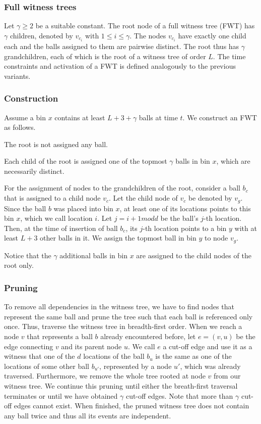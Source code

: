 \documentclass[a4paper,12pt]{article}
\begin{document}
\subsubsection{Full witness trees}
\label{sec:analysis:FullWT}
Let $\gamma \geq 2$ be a suitable constant. The root node of a full witness tree (FWT) has $\gamma$ children, denoted by $v_{c_i}$ with $1\leq i \leq \gamma$. The nodes $v_{c_i}$ have exactly one child each and the balls assigned to them are pairwise distinct. The root thus has $\gamma$ grandchildren, each of which is the root of a witness tree of order $L$. The time constraints and activation of a FWT is defined analogously to the previous variants.

\subsubsection{Construction}
\label{sec:analysis:constructionFullWT}
Assume a bin $x$ contains at least $L+3+\gamma$ balls at time $t$. We construct an FWT as follows.
\begin{compactitem}
\item The root is not assigned any ball.
\item Each child of the root is assigned one of the topmost $\gamma$ balls in bin $x$, which are necessarily distinct.
\item For the assignment of nodes to the grandchildren of the root, consider a ball $b_c$ that is assigned to a child node $v_c$. Let the child node of $v_c$ be denoted by $v_g$. Since the ball $b$ was placed into bin $x$, at least one of its locations points to this bin $x$, which we call location $i$. Let $j = i+1 mod d$ be the ball's $j$-th location. Then, at the time of insertion of ball $b_c$, its $j$-th location points to a bin $y$ with at least $L+3$ other balls in it. We assign the topmost ball in bin $y$ to node $v_g$.
\end{compactitem}
Notice that the $\gamma$ additional balls in bin $x$ are assigned to the child nodes of the root only. 

\subsubsection{Pruning}
\label{sec:analysis:pruningFullWT}
To remove all dependencies in the witness tree, we have to find nodes that represent the same ball and prune the tree such that each ball is referenced only once. Thus, traverse the witness tree in breadth-first order. When we reach a node $v$ that represents a ball $b$ already encountered before, let $e = (v,u)$ be the edge connecting $v$ and its parent node $u$. We call $e$ a cut-off edge and use it as a witness that one of the $d$ locations of the ball $b_u$ is the same as one of the locations of some other ball $b_{u'}$, represented by a node $u'$, which was already traversed. Furthermore, we remove the whole tree rooted at node $v$ from our witness tree. We continue this pruning until either the breath-first traversal terminates or until we have obtained $\gamma$ cut-off edges. Note that more than $\gamma$ cut-off edges cannot exist. When finished, the pruned witness tree does not contain any ball twice and thus all its events are independent. 
\end{document}
